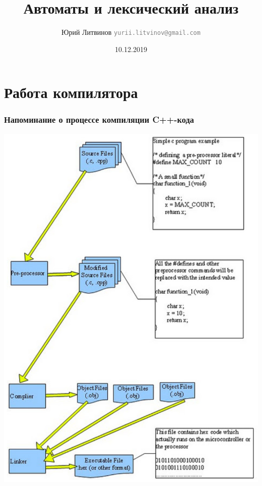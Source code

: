 \documentclass[xetex,mathserif,serif]{beamer}
\title{Автоматы и лексический анализ}
\author[Юрий Литвинов]{Юрий Литвинов \newline \textcolor{gray}{\small\texttt{yurii.litvinov@gmail.com}}}
\date{10.12.2019}
\begin{document}
	
	\frame{\titlepage}

	\section{Работа компилятора}

	\begin{frame}
		\frametitle{Напоминание о процессе компиляции C++-кода}
		\begin{center}
			\includegraphics[height=0.8\textheight]{cppCompilation.png}
		\end{center}
	\end{frame}
\end{document}
